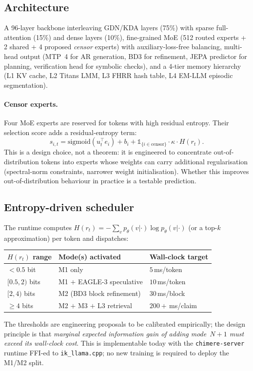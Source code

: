 \documentclass[10pt,a4paper]{article}
\theoremstyle{remark}
\begin{document}
\subsection{Architecture}
\label{sec:arch}

A 96-layer backbone interleaving GDN/KDA layers (75\%) with sparse
full-attention (15\%) and dense layers (10\%), fine-grained MoE
(512 routed experts + 2 shared + 4 proposed \emph{censor} experts)
with auxiliary-loss-free balancing, multi-head output (MTP~4 for AR
generation, BD3 for refinement, JEPA predictor for planning,
verification head for symbolic checks), and a 4-tier memory
hierarchy (L1 KV cache, L2 Titans LMM, L3 FHRR hash table, L4
EM-LLM episodic segmentation).

\paragraph{Censor experts.}
Four MoE experts are reserved for tokens with high residual
entropy. Their selection score adds a residual-entropy term:
\begin{equation}
 s_{i,t} = \mathrm{sigmoid}(u_t^{\top} e_i) + b_i
 + \mathbb{1}_{\{i \in \mathrm{censor}\}} \cdot \kappa \cdot H(r_t).
 \label{eq:censor}
\end{equation}
This is a design choice, not a theorem: it is engineered to
concentrate out-of-distribution tokens into experts whose weights
can carry additional regularisation (spectral-norm constraints,
narrower weight initialisation). Whether this improves
out-of-distribution behaviour in practice is a testable prediction.

\subsection{Entropy-driven scheduler}
\label{sec:scheduler}

The runtime computes $H(r_t) = -\sum_v p_\theta(v|\cdot)
\log p_\theta(v|\cdot)$ (or a top-$k$ approximation) per token and
dispatches:
\begin{center}
\small
\begin{tabular}{lll}
\toprule
$H(r_t)$ range & Mode(s) activated & Wall-clock target \\
\midrule
$< 0.5$ bit              & M1 only                       & $5$\,ms/token \\
$[0.5, 2)$ bits          & M1 $+$ EAGLE-3 speculative    & $10$\,ms/token \\
$[2, 4)$ bits            & M2 (BD3 block refinement)     & $30$\,ms/block \\
$\ge 4$ bits             & M2 $+$ M3 $+$ L3 retrieval    & $200+$\,ms/claim \\
\bottomrule
\end{tabular}
\end{center}
The thresholds are engineering proposals to be calibrated
empirically; the design principle is that \emph{marginal expected
information gain of adding mode~$N+1$ must exceed its wall-clock
cost}. This is implementable today with the
\texttt{chimere-server} runtime FFI-ed to \texttt{ik\_llama.cpp};
no new training is required to deploy the M1/M2 split.
\end{document}
